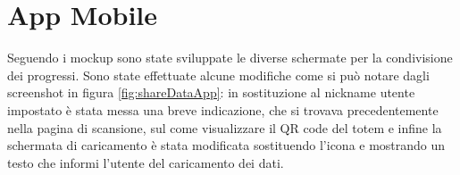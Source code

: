 \section{App Mobile}
Seguendo i mockup sono state sviluppate le diverse schermate per la condivisione dei progressi. Sono state effettuate alcune modifiche come si può notare dagli screenshot in figura \ref{fig:shareDataApp}: in sostituzione al nickname utente impostato è stata messa una breve indicazione, che si trovava precedentemente nella pagina di scansione, sul come visualizzare il QR code del totem e infine la schermata di caricamento è stata modificata sostituendo l'icona e mostrando un testo che informi l'utente del caricamento dei dati.
\begin{figure}[h!]
    \centering
\end{figure}
